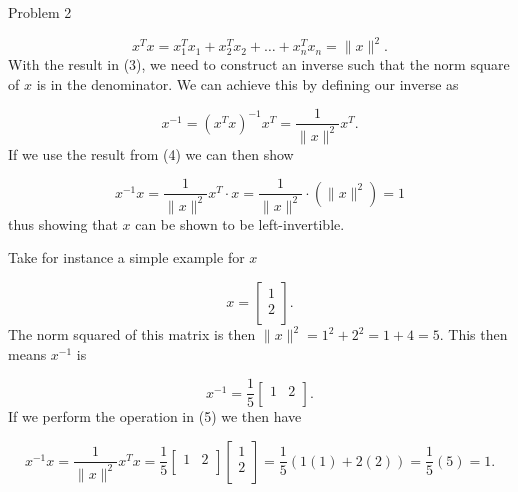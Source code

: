 \begin{problem}{Problem 2}
\begin{highlight}
        \begin{equation}
            x^{T}x = x_{1}^{T}x_{1} + x_{2}^{T}x_{2} + \dots + x_{n}^{T}x_{n} = \|x\|^{2}.
        \end{equation}
        With the result in (3), we need to construct an inverse such that the norm square of $x$ is in the denominator. We can achieve this by defining our inverse as 

        \begin{equation}
            x^{-1} = (x^{T}x)^{-1}x^{T} = \frac{1}{\|x\|^{2}} x^{T}.
        \end{equation}
        If we use the result from (4) we can then show

        \begin{equation}
            x^{-1}x = \frac{1}{\|x\|^{2}} x^{T} \cdot x = \frac{1}{\|x\|^{2}} \cdot (\|x\|^{2}) = 1
        \end{equation}
        thus showing that $x$ can be shown to be left-invertible.

        Take for instance a simple example for $x$

        \begin{equation*}
            x = 
            \begin{bmatrix}
                1 \\
                2 \\
            \end{bmatrix}.
        \end{equation*}
        The norm squared of this matrix is then $\|x\|^{2} = 1^{2} + 2^{2} = 1 + 4 = 5$. This then means $x^{-1}$ is 

        \begin{equation*}
            x^{-1} = \frac{1}{5}
            \begin{bmatrix}
                1 & 2 \\
            \end{bmatrix}.
        \end{equation*}
        If we perform the operation in (5) we then have

        \begin{equation*}
            x^{-1}x = \frac{1}{\|x\|^{2}}x^{T}x = \frac{1}{5} 
            \begin{bmatrix}
                1 & 2 \\
            \end{bmatrix}
            \begin{bmatrix}
                1 \\
                2 \\
            \end{bmatrix}
            = \frac{1}{5}(1(1) + 2(2)) = \frac{1}{5}(5) = 1.
        \end{equation*}
    \end{highlight}


\end{problem}

